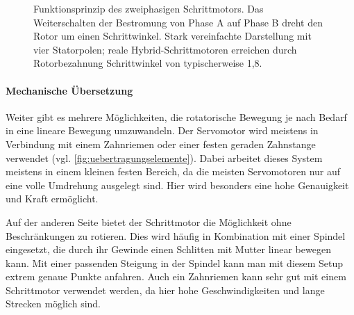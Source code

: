 \begin{figure}[htbp]
  \caption[Funktionsprinzip des zweiphasigen Schrittmotors]%
          {Funktionsprinzip des zweiphasigen Schrittmotors. Das Weiterschalten
           der Bestromung von Phase A auf Phase B dreht den Rotor um einen
           Schrittwinkel. Stark vereinfachte Darstellung mit vier Statorpolen;
           reale Hybrid-Schrittmotoren erreichen durch Rotorbezahnung
           Schrittwinkel von typischerweise 1,8\textdegree.}
  \label{fig:schrittmotor-prinzip}
\end{figure}

\paragraph{Mechanische Übersetzung}
Weiter gibt es mehrere Möglichkeiten, die rotatorische Bewegung je nach Bedarf in eine lineare Bewegung umzuwandeln.
Der Servomotor wird meistens in Verbindung mit einem Zahnriemen oder einer festen geraden Zahnstange verwendet (vgl. \cref{fig:uebertragungselemente}). Dabei arbeitet
dieses System meistens in einem kleinen festen Bereich, da die meisten Servomotoren nur auf eine volle Umdrehung ausgelegt sind.
Hier wird besonders eine hohe Genauigkeit und Kraft ermöglicht.

Auf der anderen Seite bietet der Schrittmotor die Möglichkeit ohne Beschränkungen zu rotieren. Dies wird häufig in Kombination mit einer Spindel
eingesetzt, die durch ihr Gewinde einen Schlitten mit Mutter linear bewegen kann. Mit einer passenden Steigung in der Spindel kann man
mit diesem Setup extrem genaue Punkte anfahren. Auch ein Zahnriemen kann sehr gut mit einem Schrittmotor
verwendet werden, da hier hohe Geschwindigkeiten und lange Strecken möglich sind.

